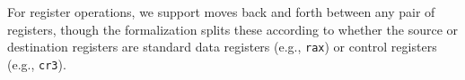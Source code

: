 For register operations, we support moves back and forth between any pair of registers, though the \coq formalization splits these according to whether
the source or destination registers are standard data registers (e.g., \lstinline|rax|) or control registers (e.g., \lstinline|cr3|).
%
